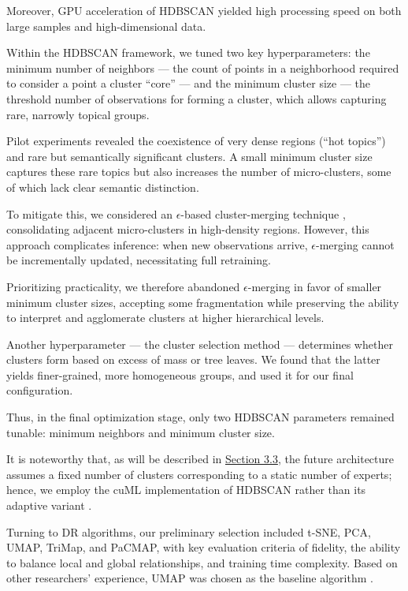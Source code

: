 Moreover, GPU acceleration of HDBSCAN yielded high processing speed on both large samples and high-dimensional data.

Within the HDBSCAN framework, we tuned two key hyperparameters: the minimum number of neighbors --- the count of points
in a neighborhood required to consider a point a cluster “core” --- and the minimum cluster size --- the threshold number
of observations for forming a cluster, which allows capturing rare, narrowly topical groups.

Pilot experiments revealed the coexistence of very dense regions (“hot topics”) and rare but semantically significant
clusters. A small minimum cluster size captures these rare topics but also increases the number of micro-clusters,
some of which lack clear semantic distinction.

To mitigate this, we considered an $\epsilon$-based cluster-merging technique \parencite{HDBSCAN2020cluster_selection_epsilon},
consolidating adjacent micro-clusters in high-density regions. However, this approach complicates inference: when new
observations arrive, $\epsilon$-merging cannot be incrementally updated, necessitating full retraining.

Prioritizing practicality, we therefore abandoned $\epsilon$-merging in favor of smaller minimum cluster sizes, accepting
some fragmentation while preserving the ability to interpret and agglomerate clusters at higher hierarchical levels.

Another hyperparameter --- the cluster selection method --- determines whether clusters form based on excess of mass
or tree leaves. We found that the latter yields finer-grained, more homogeneous groups, and used it for our final
configuration.

Thus, in the final optimization stage, only two HDBSCAN parameters remained tunable: minimum neighbors and minimum cluster
size.

It is noteworthy that, as will be described in \hyperref[sec:architecture]{Section 3.3}, the future architecture assumes
a fixed number of clusters corresponding to a static number of experts; hence, we employ the cuML implementation of HDBSCAN
rather than its adaptive variant \parencite{HDBSCAN2022adaptive}.

Turning to DR algorithms, our preliminary selection included t-SNE, PCA, UMAP, TriMap, and PaCMAP,
with key evaluation criteria of fidelity, the ability to balance local and global relationships, and training time complexity.
Based on other researchers' experience, UMAP was chosen as the baseline algorithm \parencite{BERTopic2022}.

